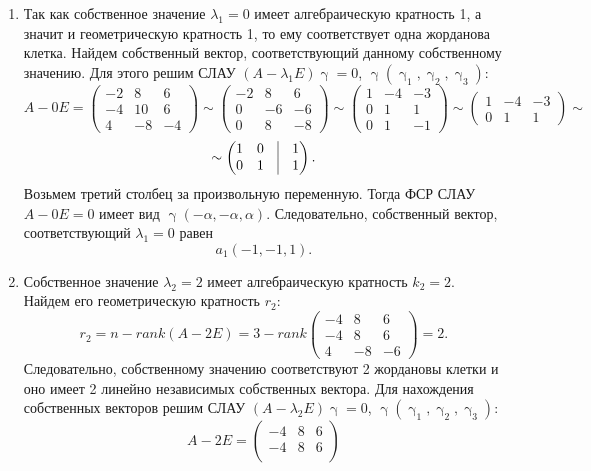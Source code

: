 \documentclass[a4paper, 12pt]{article}
\begin{document}
\begin{enumerate}
	\item Так как собственное значение $\lambda_1 = 0$ имеет алгебраическую кратность 1, а значит и геометрическую кратность 1, то ему соответствует одна жорданова клетка. Найдем собственный вектор, соответствующий данному собственному значению. Для этого решим СЛАУ $(A - \lambda_1 E)\upgamma = 0$, $\upgamma(\upgamma_1, \upgamma_2, \upgamma_3)$:
	$$A - 0E = \begin{pmatrix}
		-2 & 8 & 6\\
		-4 & 10 & 6\\
		4 & -8 & -4
	\end{pmatrix} \sim \begin{pmatrix}
	-2 & 8 & 6\\
	0 & -6 & -6\\
	0 & 8 & -8
\end{pmatrix}\sim \begin{pmatrix}
1 & -4 & -3\\
0 & 1 & 1\\
0 & 1 & -1
\end{pmatrix}\sim \begin{pmatrix}
1 & -4 & -3\\
0 & 1 & 1
\end{pmatrix}\sim $$ $$\sim\begin{pmatrix}
1 & 0 & \vline & 1\\
0 & 1 &\vline & 1
\end{pmatrix}.$$
Возьмем третий столбец за произвольную переменную. Тогда ФСР СЛАУ $A - 0 E = 0$ имеет вид $\upgamma(-\alpha, -\alpha, \alpha)$. Следовательно, собственный вектор, соответствующий $\lambda_1 = 0$ равен
$$a_1(-1, -1, 1).$$
\item Собственное значение $\lambda_2 = 2$ имеет алгебраическую кратность $k_2 = 2$. Найдем его геометрическую кратность $r_2$:
$$r_2 = n - rank(A - 2E) = 3 - rank\begin{pmatrix}
	-4 & 8 & 6\\
	-4 & 8 & 6\\
	4 & -8 & -6
\end{pmatrix} = 2.$$ Следовательно, собственному значению соответствуют 2 жордановы клетки и оно имеет 2 линейно независимых собственных вектора. Для нахождения собственных векторов решим СЛАУ $(A - \lambda_2 E)\upgamma = 0$, $\upgamma(\upgamma_1, \upgamma_2, \upgamma_3)$: $$A - 2E = \begin{pmatrix}
-4 & 8 & 6\\
-4 & 8 & 6\\

\end{pmatrix}$$
\end{enumerate}
\end{document}
